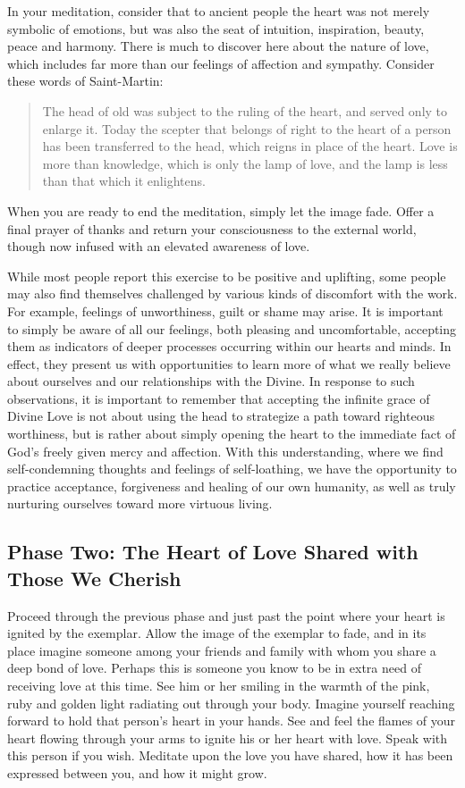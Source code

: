 \documentclass{article}
\begin{document}
In your meditation, consider that to ancient people the heart was not merely symbolic of
emotions, but was also the seat of intuition, inspiration, beauty, peace and harmony. There is much to discover here about the nature of love, which includes far more than our
feelings of affection and sympathy. Consider these words of Saint-Martin:

\begin{quote}
	The head of old was subject to the ruling of the heart, and served only to enlarge
	it. Today the scepter that belongs of right to the heart of a person has been
	transferred to the head, which reigns in place of the heart. Love is more than
	knowledge, which is only the lamp of love, and the lamp is less than that which it
	enlightens.
\end{quote}

When you are ready to end the meditation, simply let the image fade. Offer a final prayer
of thanks and return your consciousness to the external world, though now infused with
an elevated awareness of love.

While most people report this exercise to be positive and uplifting, some people may also
find themselves challenged by various kinds of discomfort with the work. For example,
feelings of unworthiness, guilt or shame may arise. It is important to simply be aware of
all our feelings, both pleasing and uncomfortable, accepting them as indicators of deeper
processes occurring within our hearts and minds. In effect, they present us with
opportunities to learn more of what we really believe about ourselves and our
relationships with the Divine. In response to such observations, it is important to
remember that accepting the infinite grace of Divine Love is not about using the head to
strategize a path toward righteous worthiness, but is rather about simply opening the heart
to the immediate fact of God’s freely given mercy and affection. With this
understanding, where we find self-condemning thoughts and feelings of self-loathing, we
have the opportunity to practice acceptance, forgiveness and healing of our own
humanity, as well as truly nurturing ourselves toward more virtuous living.

\subsection*{Phase Two: The Heart of Love Shared with Those We Cherish}

Proceed through the previous phase and just past the point where your heart is ignited by
the exemplar. Allow the image of the exemplar to fade, and in its place imagine someone
among your friends and family with whom you share a deep bond of love. Perhaps this is
someone you know to be in extra need of receiving love at this time. See him or her
smiling in the warmth of the pink, ruby and golden light radiating out through your body.
Imagine yourself reaching forward to hold that person’s heart in your hands. See and feel
the flames of your heart flowing through your arms to ignite his or her heart with love.
Speak with this person if you wish. Meditate upon the love you have shared, how it has
been expressed between you, and how it might grow.
\end{document}
